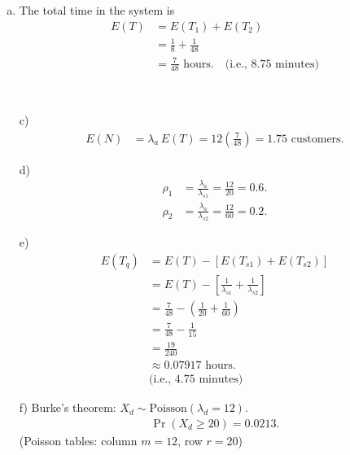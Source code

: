 \documentclass[12pt]{article}
\begin{document}
{\begin{minipage}[t]{0.98\textwidth}
\begin{minipage}[t]{0.47\textwidth}
\begin{enumerate}[a)]
\begin{align*}
\end{align*}
The time spent in the paying system is\\
$T_2 \sim \text{Exponential}(\lambda_2 = \lambda_{s2}-\lambda_a=48)$
\begin{align*}
\Rightarrow E(T_2) &= \frac{1}{48} \text{ hours}. \quad \text{(i.e., 1.25 minutes)}
\end{align*}
\item The total time in the system is
\begin{align*}
E(T) &= E(T_1) + E(T_2) \\&= \frac{1}{8} + \frac{1}{48} \\&= \frac{7}{48} \text{ hours}. \quad \text{(i.e., 8.75 minutes)}
\end{align*}
\end{enumerate}
\end{minipage}\hspace{0.04\textwidth}
\begin{minipage}[t]{0.47\textwidth}
\quad\\[-1cm]
\begin{enumerate}
\item[c)] \quad\\[-1.45cm]
\begin{align*}
E(N) &= \lambda_a\, E(T) = 12\left(\frac{7}{48}\right) = 1.75 \text{ customers}.
\end{align*}
\item[d)] \quad\\[-1.45cm]
\begin{align*}
\rho_1 &= \frac{\lambda_a}{\lambda_{s1}} = \frac{12}{20} = 0.6.\\[0.3cm]
\rho_2 &= \frac{\lambda_a}{\lambda_{s2}} = \frac{12}{60} = 0.2.
\end{align*}
\item[e)] \quad\\[-1.45cm]
\begin{align*}
E(T_q) &= E(T) - [E(T_{s1})+E(T_{s2})]\\
&= E(T) - \left[\frac{1}{\lambda_{s1}}+\frac{1}{\lambda_{s2}}\right]\\
&= \frac{7}{48} - \left(\frac{1}{20}+\frac{1}{60}\right)\\
&= \frac{7}{48} - \frac{1}{15}\\
&= \frac{19}{240}\\
&\approx0.07917 \text{ hours}.\\
&\text{(i.e., 4.75 minutes)}
\end{align*}
\item[f)] Burke's theorem: $X_d \sim \text{Poisson}(\lambda_d=12)$.
\begin{align*}
\Pr(X_d \ge 20) = 0.0213.
\end{align*}
(Poisson tables: column $m = 12$, row $r=20$)
\end{enumerate}
\end{minipage}
\end{minipage}}\vspace{0.03\textwidth}
\end{document}

